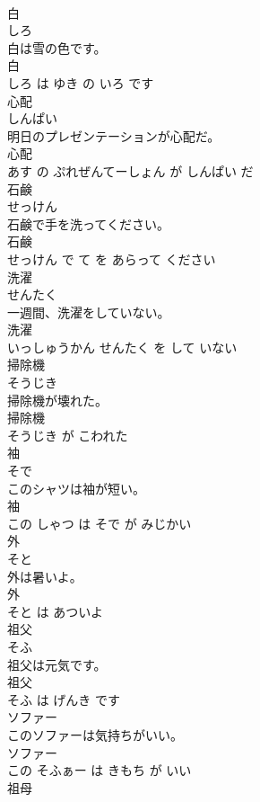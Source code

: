 \documentclass[8pt]{extreport}
\begin{document}
\begin{CJK}{UTF8}{min}
\\	白	
\\	しろ			
\\	白は雪の色です。	
\\	白 
\\	しろ は ゆき の いろ です			
\\	心配	
\\	しんぱい			
\\	明日のプレゼンテーションが心配だ。	
\\	心配 
\\	あす の ぷれぜんてーしょん が しんぱい だ			
\\	石鹸	
\\	せっけん			
\\	石鹸で手を洗ってください。	
\\	石鹸 
\\	せっけん で て を あらって ください			
\\	洗濯	
\\	せんたく			
\\	一週間、洗濯をしていない。	
\\	洗濯 
\\	いっしゅうかん せんたく を して いない			
\\	掃除機	
\\	そうじき			
\\	掃除機が壊れた。	
\\	掃除機 
\\	そうじき が こわれた			
\\	袖	
\\	そで			
\\	このシャツは袖が短い。	
\\	袖 
\\	この しゃつ は そで が みじかい			
\\	外	
\\	そと			
\\	外は暑いよ。	
\\	外 
\\	そと は あついよ			
\\	祖父	
\\	そふ			
\\	祖父は元気です。	
\\	祖父 
\\	そふ は げんき です			
\\	ソファー	
\\	このソファーは気持ちがいい。	
\\	ソファー 
\\	この そふぁー は きもち が いい			
\\	祖母	

\end{CJK}
\end{document}
